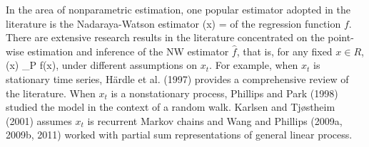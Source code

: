 In the area of nonparametric estimation, one popular estimator adopted in the literature is the Nadaraya-Watson estimator
\bestar
  (x) = 
\eestar
of the regression function $f$. There are extensive research results in the literature concentrated on the point-wise estimation and inference of the NW estimator $\hat{f}$, that is, for any fixed $x \in R$,
\bestar
{}(x) \to_P f(x),
\eestar
under different assumptions on $x_t$. For example, when $x_t$ is stationary time series, H\"{a}rdle et al. (1997) provides a comprehensive review of the literature. When $x_t$ is a nonstationary process, Phillips and Park (1998) studied the model in the context of a random walk. Karlsen and Tj\o stheim (2001) assumes $x_t$ is recurrent Markov chains and Wang and Phillips (2009a, 2009b, 2011) worked with partial sum representations of general linear process. 

